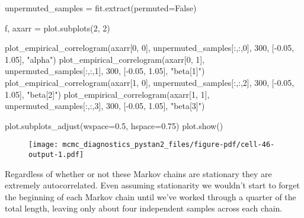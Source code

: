 \documentclass[
  letterpaper,
  DIV=11,
  numbers=noendperiod]{scrartcl}
\newenvironment{Shaded}{\begin{snugshade}}{\end{snugshade}}
\newcommand{\DecValTok}[1]{\textcolor[rgb]{0.68,0.00,0.00}{#1}}
\newcommand{\FloatTok}[1]{\textcolor[rgb]{0.68,0.00,0.00}{#1}}
\newcommand{\NormalTok}[1]{\textcolor[rgb]{0.00,0.23,0.31}{#1}}
\newcommand{\OperatorTok}[1]{\textcolor[rgb]{0.37,0.37,0.37}{#1}}
\newcommand{\StringTok}[1]{\textcolor[rgb]{0.13,0.47,0.30}{#1}}
\newcommand{\VariableTok}[1]{\textcolor[rgb]{0.07,0.07,0.07}{#1}}
\begin{document}
\begin{Shaded}
\begin{Highlighting}[]
\NormalTok{unpermuted\_samples }\OperatorTok{=}\NormalTok{ fit.extract(permuted}\OperatorTok{=}\VariableTok{False}\NormalTok{)}

\NormalTok{f, axarr }\OperatorTok{=}\NormalTok{ plot.subplots(}\DecValTok{2}\NormalTok{, }\DecValTok{2}\NormalTok{)}

\NormalTok{plot\_empirical\_correlogram(axarr[}\DecValTok{0}\NormalTok{, }\DecValTok{0}\NormalTok{], unpermuted\_samples[:,:,}\DecValTok{0}\NormalTok{], }
                           \DecValTok{300}\NormalTok{, [}\OperatorTok{{-}}\FloatTok{0.05}\NormalTok{, }\FloatTok{1.05}\NormalTok{], }\StringTok{"alpha"}\NormalTok{)}
\NormalTok{plot\_empirical\_correlogram(axarr[}\DecValTok{0}\NormalTok{, }\DecValTok{1}\NormalTok{], unpermuted\_samples[:,:,}\DecValTok{1}\NormalTok{], }
                           \DecValTok{300}\NormalTok{, [}\OperatorTok{{-}}\FloatTok{0.05}\NormalTok{, }\FloatTok{1.05}\NormalTok{], }\StringTok{"beta[1]"}\NormalTok{)}
\NormalTok{plot\_empirical\_correlogram(axarr[}\DecValTok{1}\NormalTok{, }\DecValTok{0}\NormalTok{], unpermuted\_samples[:,:,}\DecValTok{2}\NormalTok{], }
                           \DecValTok{300}\NormalTok{, [}\OperatorTok{{-}}\FloatTok{0.05}\NormalTok{, }\FloatTok{1.05}\NormalTok{], }\StringTok{"beta[2]"}\NormalTok{)}
\NormalTok{plot\_empirical\_correlogram(axarr[}\DecValTok{1}\NormalTok{, }\DecValTok{1}\NormalTok{], unpermuted\_samples[:,:,}\DecValTok{3}\NormalTok{], }
                           \DecValTok{300}\NormalTok{, [}\OperatorTok{{-}}\FloatTok{0.05}\NormalTok{, }\FloatTok{1.05}\NormalTok{], }\StringTok{"beta[3]"}\NormalTok{)}

\NormalTok{plot.subplots\_adjust(wspace}\OperatorTok{=}\FloatTok{0.5}\NormalTok{, hspace}\OperatorTok{=}\FloatTok{0.75}\NormalTok{)}
\NormalTok{plot.show()}
\end{Highlighting}
\end{Shaded}

\begin{figure}[H]

{\centering \texttt{[image: mcmc\_diagnostics\_pystan2\_files/figure-pdf/cell-46-output-1.pdf]}

}

\end{figure}

Regardless of whether or not these Markov chains are stationary they are
extremely autocorrelated. Even assuming stationarity we wouldn't start
to forget the beginning of each Markov chain until we've worked through
a quarter of the total length, leaving only about four independent
samples across each chain.
\end{document}
